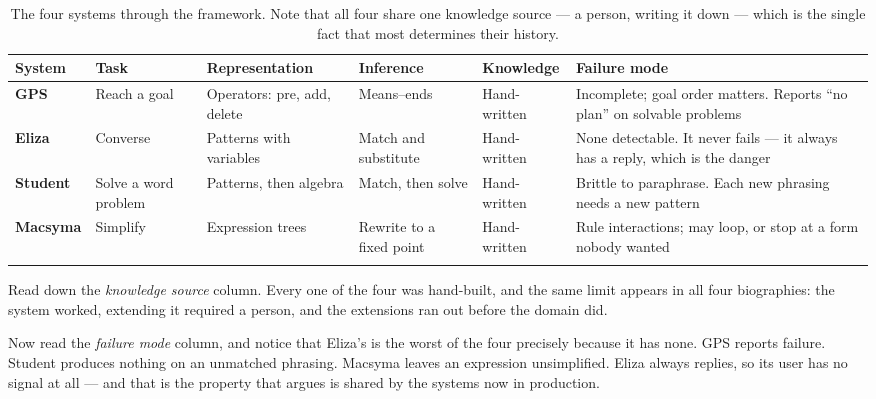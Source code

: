 \smallskip
{\small
\setlength{\emergencystretch}{3em}\relax
\setlength{\tabcolsep}{4pt}
\noindent\begin{longtable}{@{}L{1.8cm}L{2.0cm}L{2.4cm}L{2.2cm}L{2.1cm}L{3.4cm}@{}}
\toprule
{}
\textbf{System} & \textbf{Task} & \textbf{Represen\-tation} &
\textbf{Inference} & \textbf{Knowledge} & \textbf{Failure mode} \\
\midrule
\endhead
\textbf{GPS} & Reach a goal & Operators: pre, add, delete & Means--ends &
Hand-written & Incomplete; goal order matters. Reports ``no plan'' on solvable
problems \\
\textbf{Eliza} & Converse & Patterns with variables & Match and substitute &
Hand-written & None detectable. It never fails --- it always has a reply, which is
the danger \\
\textbf{Student} & Solve a word problem & Patterns, then algebra & Match, then
solve & Hand-written & Brittle to paraphrase. Each new phrasing needs a new
pattern \\
\textbf{Macsyma} & Simplify & Expression trees & Rewrite to a fixed point &
Hand-written & Rule interactions; may loop, or stop at a form nobody
wanted \\
\bottomrule
\caption{The four systems through the framework. Note that all four share one
knowledge source --- a person, writing it down --- which is the single fact that
most determines their history.}\label{tab:classic-analysis}
\end{longtable}}

\begin{conceptbox}
Read down the \emph{knowledge source} column. Every one of the four was hand-built,
and the same limit appears in all four biographies: the system worked, extending it
required a person, and the extensions ran out before the domain did.

Now read the \emph{failure mode} column, and notice that Eliza's is the worst of
the four precisely because it has none. GPS reports failure. Student produces
nothing on an unmatched phrasing. Macsyma leaves an expression unsimplified. Eliza
always replies, so its user has no signal at all --- and that is the property that
 argues is shared by the systems now in production.
\end{conceptbox}

